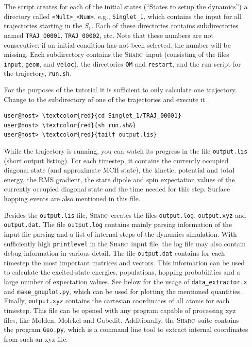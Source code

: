 \documentclass[a4paper,11pt,DIV=15,openany]{scrbook}
\newcommand{\sharc}{\textsc{Sharc}}
\newcommand{\ttt}[1]{\texttt{#1}}
\begin{document}
The script creates for each of the initial states (``States to setup the dynamics'') a directory called \ttt{<Mult>\_<Num>}, e.g., \ttt{Singlet\_1}, which contains the input for all trajectories starting in the $S_1$. 
Each of these directories contains subdirectories named \ttt{TRAJ\_00001}, \ttt{TRAJ\_00002}, etc. Note that these numbers are not consecutive: if an initial condition has not been selected, the number will be missing.
Each subdirectory contains the \sharc\ input (consisting of the files \ttt{input}, \ttt{geom}, and \ttt{veloc}), the directories \ttt{QM} and \ttt{restart}, and the run script for the trajectory, \ttt{run.sh}.

For the purposes of the tutorial it is sufficient to only calculate one trajectory. Change to the subdirectory of one of the trajectories and execute it.
\begin{Verbatim}[commandchars=\\\{\}]
user@host> \textcolor{red}{cd Singlet_1/TRAJ_00001}
user@host> \textcolor{red}{sh run.sh&}
user@host> \textcolor{red}{tailf output.lis}
\end{Verbatim}
While the trajectory is running, you can watch its progress in the file \ttt{output.lis} (short output listing). For each timestep, it contains the currently occupied diagonal state (and approximate MCH state), the kinetic, potential and total energy, the RMS gradient, the state dipole and spin expectation values of the currently occupied diagonal state and the time needed for this step. Surface hopping events are also mentioned in this file.

Besides the \ttt{output.lis} file, \sharc\ creates the files \ttt{output.log}, \ttt{output.xyz} and \ttt{output.dat}. The file
\ttt{output.log} contains mainly parsing information of the input file parsing and a list of internal steps of the dynamics simulation. With sufficiently high \ttt{printlevel} in the \sharc\ input file, the log file may also contain debug information in various detail.
The file \ttt{output.dat} contains for each timestep the most important matrices and vectors. This information can be used to calculate the excited-state energies, populations, hopping probabilities and a large number of expectation values. See below for the usage of \ttt{data\_extractor.x} and \ttt{make\_gnuplot.py}, which can be used for plotting the mentioned quantities.
Finally, \ttt{output.xyz} contains the cartesian coordinates of all atoms for each timestep. This file can be opened with any program capable of processing xyz files, like Molden, Molekel and Gabedit. Additionally, the \sharc\ suite contains the program \ttt{Geo.py}, which is a command line tool to extract internal coordinates from such an xyz file.
\end{document}
